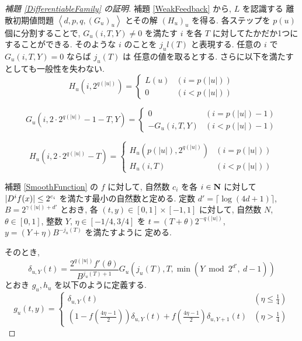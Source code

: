  \begin{proof}[\rm 補題 \ref{DifferentiableFamily} の証明]
  補題 \ref{WeakFeedback} から, $L$ を認識する 
  離散初期値問題 $\left< d, p, q,(G_u)_u \right>$
  とその解 $(H_u)_u$ を得る.
  各ステップを $p(u)$ 個に分割することで, $G_u(i, T, Y) \not = 0$ を満たす
  $i$ を各 $T$ に対してたかだか1つにすることができる. そのような $i$ のことを 
  $j_ul(T)$ と表現する. 任意の $i$ で $G_u(i, T, Y) = 0$ ならば $j_u(T)$ は
  任意の値を取るとする. 
  さらに以下を満たすとしても一般性を失わない.
  \begin{equation}
   H_u(i, 2^{q(|u|)}) = \begin{cases}
			 L(u) & (i=p(|u|)) \\
			0 & (i<p(|u|))
			\end{cases}
  \end{equation}

 \begin{equation}
  G_u(i, 2\cdot 2^{q(|u|)} - 1 - T, Y) 
   = \begin{cases}
      0 & (i=p(|u|)-1) \\
      -G_u(i,T,Y) & (i<p(|u|)-1)
     \end{cases}
 \end{equation}

 \begin{equation}
  H_u(i, 2 \cdot 2^{q(|u|)} - T) 
  = \begin{cases}
    H_u(p(|u|), 2^{q(|u|)}) & (i=p(|u|)) \\
    H_u(i, T) &  (i<p(|u|))
    \end{cases}
 \end{equation}

  補題 \ref{SmoothFunction} の $f$ に対して, 
 自然数 $c_i$ を各 $i \in \mathbf N$ に対して 
  $|D^i f(x)| \le 2^{c_i}$ を満たす最小の自然数と定める.
 定数 $d' = \lceil \log (4d + 1) \rceil$, 
 $B = 2^{\gamma(|u|) + d'}$ とおき, 
 各 $(t, y) \in [0,1] \times [-1, 1]$ に対して,
 自然数 $N$, $\theta \in [0,1]$, 整数 $Y$, $\eta \in [-1/4, 3/4]$ を
 $t = (T + \theta)2^{-q(|u|)}$, $y = (Y + \eta)B^{-j_u(T)}$ を満たすように
 定める.
 
 そのとき,
 \begin{equation}
  \delta_{u, Y} (t) = \frac{2^{q(|u|)} f'(\theta)}{B^{j_u(T)+1}} 
   G_u\left( j_u(T), T, \min \left(Y \bmod 2^{d'}\!\!\!,\ d-1 \right) \right)
 \end{equation}
 とおき $g_u, h_u$ を以下のように定義する.
 \begin{equation}
  g_u(t,y) 
  = \begin{cases}
     \delta_{u, Y}(t)& (\eta \le \frac 1 4) \\
     ( 1-f ( \frac{4\eta-1}{2})) \delta_{u, Y}(t) 
     + f ( \frac{4\eta-1}{2}) \delta_{u,Y+1}(t)
     & (\eta > \frac 1 4)
    \end{cases}
  \label{eq:gu}
 \end{equation}


\end{proof}
